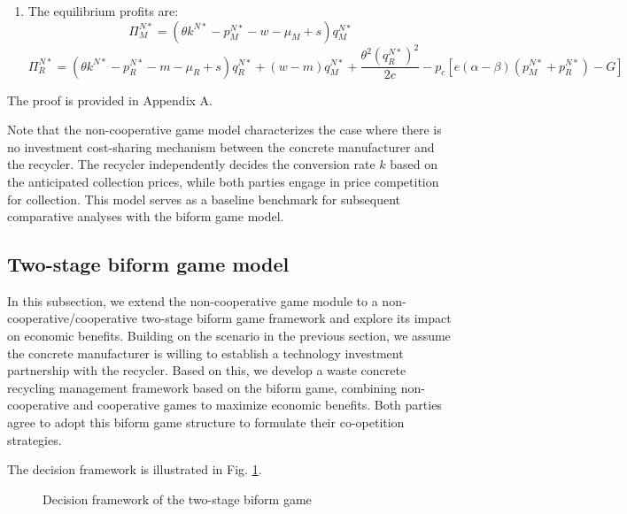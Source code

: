 \documentclass[authoryear,preprint,review,times,10pt]{elsarticle}
\begin{document}
\begin{prop}
\begin{enumerate}[label={(\arabic*)}]
\item The equilibrium profits are:
\begin{equation}
\Pi_M^{N*} = (\theta k^{N*} - p_M^{N*} - w - \mu_M + s)q_M^{N*}
\label{eq:Pi_MN_star}
\end{equation}
\begin{equation}
\Pi_R^{N*} = (\theta k^{N*} - p_R^{N*} - m - \mu_R + s)q_R^{N*} + (w - m)q_M^{N*}
+ \frac{\theta^2(q_R^{N*})^2}{2c} - p_c\left[ e(\alpha - \beta)(p_M^{N*} + p_R^{N*}) - G \right]
\label{eq:Pi_RN_star}
\end{equation}
\end{enumerate}
\end{prop}

 The proof is provided in Appendix A.

Note that the non-cooperative game model characterizes the case where there is no investment cost-sharing mechanism between the concrete manufacturer and the recycler. The recycler independently decides the conversion rate $k$ based on the anticipated collection prices, while both parties engage in price competition for collection. This model serves as a baseline benchmark for subsequent comparative analyses with the biform game model.

\subsection{Two-stage biform game model}
\label{sec:biform_model}
In this subsection, we extend the non-cooperative game module to a non-cooperative/cooperative two-stage biform game framework and explore its impact on economic benefits. Building on the scenario in the previous section, we assume the concrete manufacturer is willing to establish a technology investment partnership with the recycler. Based on this, we develop a waste concrete recycling management framework based on the biform game, combining non-cooperative and cooperative games to maximize economic benefits. Both parties agree to adopt this biform game structure to formulate their co-opetition strategies.

The decision framework is illustrated in Fig. \ref{fig:biform_framework}.

\begin{figure}[!htbp]
\centering
{}
\captionsetup{font=normalsize, labelsep=period}
\caption{Decision framework of the two-stage biform game}
\label{fig:biform_framework}
\end{figure}
\end{document}
